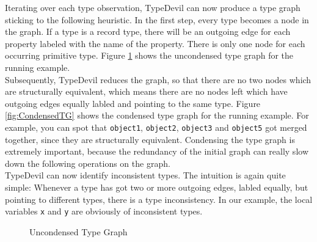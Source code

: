 \documentclass[runningheads,a4paper]{llncs}
\begin{document}
Iterating over each type observation, TypeDevil can now produce a type graph sticking to the following heuristic.
In the first step, every type becomes a node in the graph.
If a type is a record type, there will be an outgoing edge for each property labeled with the name of the property.
There is only one node for each occurring primitive type.
Figure \ref{fig:UncondensedTG} shows the uncondensed type graph for the running example.\\
Subsequently, TypeDevil reduces the graph, so that there are no two nodes which are structurally equivalent, which means there are no nodes left which have outgoing edges equally labled and pointing to the same type.
Figure \ref{fig:CondensedTG} shows the condensed type graph for the running example.
For example, you can spot that \lstinline[columns=fixed]{object1}, \lstinline[columns=fixed]{object2}, \lstinline[columns=fixed]{object3} and \lstinline[columns=fixed]{object5} got merged together, since they are structurally equivalent.
Condensing the type graph is extremely important, because the redundancy of the initial graph can really slow down the following operations on the graph. \\
TypeDevil can now identify inconsistent types. 
The intuition is again quite simple: 
Whenever a type has got two or more outgoing edges, labled equally, but pointing to different types, there is a type inconsistency.
In our example, the local variables \lstinline[columns=fixed]{x} and \lstinline[columns=fixed]{y} are obviously of inconsistent types.

\begin{figure}[h]
\caption{Uncondensed Type Graph}
\label{fig:UncondensedTG}
\end{figure}
\end{document}
